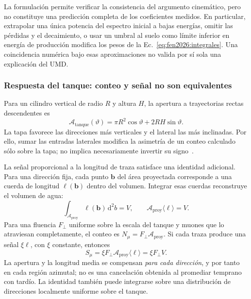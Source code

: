 La formulación permite verificar la consistencia del argumento cinemático, pero no constituye una predicción completa de los coeficientes medidos. En particular, extrapolar una única potencia del espectro inicial a bajas energías, omitir las pérdidas y el decaimiento, o usar un umbral al suelo como límite inferior en energía de producción modifica los pesos de la Ec.~\ref{eq:fen2026:integrales}. Una coincidencia numérica bajo esas aproximaciones no valida por sí sola una explicación del UMD.

\subsubsection{Respuesta del tanque: conteo y señal no son equivalentes}
\label{subsubsec:fen2026:tanque}

Para un cilindro vertical de radio $R$ y altura $H$, la apertura a trayectorias rectas descendentes es
\begin{equation}
\mathcal A_{\mathrm{tanque}}(\vartheta)
=\pi R^2\cos\vartheta+2RH\sin\vartheta.
\label{eq:fen2026:apertura}
\end{equation}
La tapa favorece las direcciones más verticales y el lateral las más inclinadas. Por ello, sumar las entradas laterales modifica la asimetría de un conteo calculado sólo sobre la tapa; no implica necesariamente invertir su signo~\cite{GAP2000_017}.

La señal proporcional a la longitud de traza satisface una identidad adicional. Para una dirección fija, cada punto $\mathbf b$ del área proyectada corresponde a una cuerda de longitud $\ell(\mathbf b)$ dentro del volumen. Integrar esas cuerdas reconstruye el volumen de agua:
\begin{equation}
\int_{\mathcal A_{\mathrm{proy}}}\ell(\mathbf b)\,\mathrm d^2b=V,
\qquad
\mathcal A_{\mathrm{proy}}\langle\ell\rangle=V.
\label{eq:fen2026:cuerdas}
\end{equation}
Para una fluencia $F_\perp$ uniforme sobre la escala del tanque y muones que lo atraviesan completamente, el conteo es $N_\mu=F_\perp\mathcal A_{\mathrm{proy}}$. Si cada traza produce una señal $\xi\ell$, con $\xi$ constante, entonces
\begin{equation}
S_\mu=\xi F_\perp\mathcal A_{\mathrm{proy}}\langle\ell\rangle
=\xi F_\perp V.
\label{eq:fen2026:cancelacion}
\end{equation}
La apertura y la longitud media se compensan \emph{para cada dirección}, y por tanto en cada región azimutal; no es una cancelación obtenida al promediar temprano con tardío. La identidad también puede integrarse sobre una distribución de direcciones localmente uniforme sobre el tanque.

